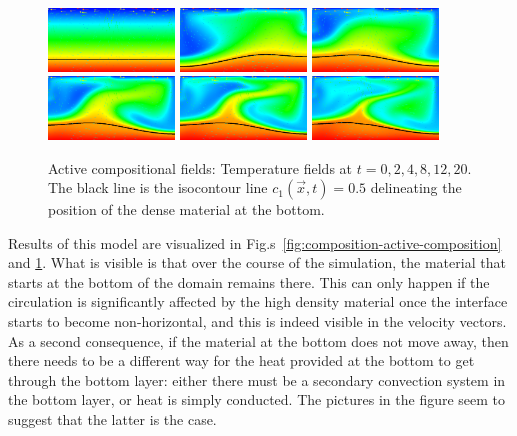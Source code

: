 \documentclass{article}
\begin{document}
\begin{figure}
  \centering
  \centering
  \includegraphics[width=0.3\textwidth]{cookbooks/composition-active/visit0000.png}
  \hfill
  \includegraphics[width=0.3\textwidth]{cookbooks/composition-active/visit0001.png}
  \hfill
  \includegraphics[width=0.3\textwidth]{cookbooks/composition-active/visit0002.png}
  \\
  \includegraphics[width=0.3\textwidth]{cookbooks/composition-active/visit0003.png}
  \hfill
  \includegraphics[width=0.3\textwidth]{cookbooks/composition-active/visit0004.png}
  \hfill
  \includegraphics[width=0.3\textwidth]{cookbooks/composition-active/visit0006.png}
  \caption{Active compositional fields: Temperature fields at $t=0, 2, 4, 8, 12,
    20$. The black line is the isocontour line $c_1(\vec x,t)=0.5$
    delineating the position of the dense material at the bottom.}
  \label{fig:composition-active-temperature}
\end{figure}

Results of this model are visualized in
Fig.s~\ref{fig:composition-active-composition} and \ref{fig:composition-active-temperature}. What is visible is
that over the course of the simulation, the material that starts at the bottom
of the domain remains there. This can only happen if the circulation is
significantly affected by the high density material once the interface starts
to become non-horizontal, and this is
indeed visible in the velocity vectors. As a second consequence, if the
material at the bottom does not move away, then there needs to be a different
way for the heat provided at the bottom to get through the bottom layer:
either there must be a secondary convection system in the bottom layer, or
heat is simply conducted. The pictures in the figure seem to suggest
that the latter is the case.
\end{document}
